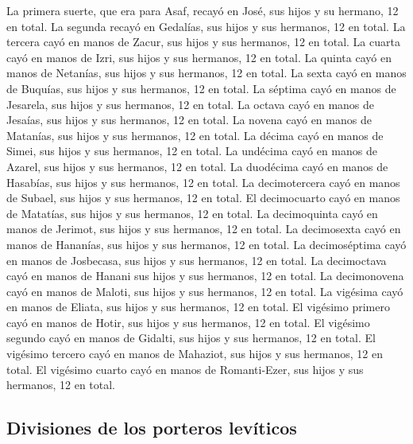  La primera suerte, que era para Asaf, recayó en José, sus
hijos y su hermano, 12 en total. La segunda recayó en Gedalías, sus
hijos y sus hermanos, 12 en total.  La tercera cayó en
manos de Zacur, sus hijos y sus hermanos, 12 en total. 
La cuarta cayó en manos de Izri, sus hijos y sus hermanos, 12 en total.
 La quinta cayó en manos de Netanías, sus hijos y sus
hermanos, 12 en total.  La sexta cayó en manos de
Buquías, sus hijos y sus hermanos, 12 en total.  La
séptima cayó en manos de Jesarela, sus hijos y sus hermanos, 12 en
total.  La octava cayó en manos de Jesaías, sus hijos y
sus hermanos, 12 en total.  La novena cayó en manos de
Matanías, sus hijos y sus hermanos, 12 en total.  La
décima cayó en manos de Simei, sus hijos y sus hermanos, 12 en total.
 La undécima cayó en manos de Azarel, sus hijos y sus
hermanos, 12 en total.  La duodécima cayó en manos de
Hasabías, sus hijos y sus hermanos, 12 en total.  La
decimotercera cayó en manos de Subael, sus hijos y sus hermanos, 12 en
total.  El decimocuarto cayó en manos de Matatías, sus
hijos y sus hermanos, 12 en total.  La decimoquinta cayó
en manos de Jerimot, sus hijos y sus hermanos, 12 en total.
 La decimosexta cayó en manos de Hananías, sus hijos y
sus hermanos, 12 en total.  La decimoséptima cayó en
manos de Josbecasa, sus hijos y sus hermanos, 12 en total.
 La decimoctava cayó en manos de Hanani sus hijos y sus
hermanos, 12 en total.  La decimonovena cayó en manos de
Maloti, sus hijos y sus hermanos, 12 en total.  La
vigésima cayó en manos de Eliata, sus hijos y sus hermanos, 12 en total.
 El vigésimo primero cayó en manos de Hotir, sus hijos y
sus hermanos, 12 en total.  El vigésimo segundo cayó en
manos de Gidalti, sus hijos y sus hermanos, 12 en total. 
El vigésimo tercero cayó en manos de Mahaziot, sus hijos y sus hermanos,
12 en total.  El vigésimo cuarto cayó en manos de
Romanti-Ezer, sus hijos y sus hermanos, 12 en total.

\hypertarget{divisiones-de-los-porteros-levuxedticos}{%
\subsection{Divisiones de los porteros
levíticos}\label{divisiones-de-los-porteros-levuxedticos}}

